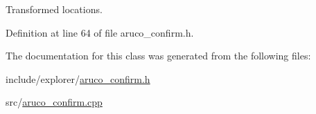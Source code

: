 Transformed locations. 



Definition at line 64 of file aruco\+\_\+confirm.\+h.



The documentation for this class was generated from the following files\+:\begin{DoxyCompactItemize}
\item 
include/explorer/\hyperlink{aruco__confirm_8h}{aruco\+\_\+confirm.\+h}\item 
src/\hyperlink{aruco__confirm_8cpp}{aruco\+\_\+confirm.\+cpp}\end{DoxyCompactItemize}
